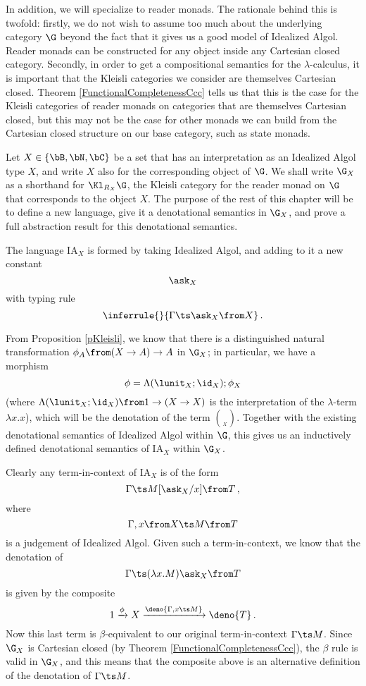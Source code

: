 In addition, we will specialize to reader monads.  
The rationale behind this is twofold: firstly, we do not wish to assume too much about the underlying category $\G$ beyond the fact that it gives us a good model of Idealized Algol.  
Reader monads can be constructed for any object inside any Cartesian closed category.
Secondly, in order to get a compositional semantics for the $\lambda$-calculus, it is important that the Kleisli categories we consider are themselves Cartesian closed.  
Theorem \ref{FunctionalCompletenessCcc} tells us that this is the case for the Kleisli categories of reader monads on categories that are themselves Cartesian closed, but this may not be the case for other monads we can build from the Cartesian closed structure on our base category, such as state monads.

Let $X\in \{\bB,\bN,\bC\}$ be a set that has an interpretation as an Idealized Algol type $X$, and write $X$ also for the corresponding object of $\G$.
We shall write $\G_X$ as a shorthand for $\Kl_{R_X}\G$, the Kleisli category for the reader monad on $\G$ that corresponds to the object $X$.  
The purpose of the rest of this chapter will be to define a new language, give it a denotational semantics in $\G_X$, and prove a full abstraction result for this denotational semantics.

\newcommand{\IAX}{{IA${}_X$}\xspace}
\begin{definition}[{The language \IAX}]
  The language \IAX is formed by taking Idealized Algol, and adding to it a new constant
  \[
    \ask_X
    \]
  with typing rule
  \[
    \inferrule{ }{\Gamma \ts \ask_X \from X}\,.
    \]
\end{definition}

From Proposition \ref{pKleisli}, we know that there is a distinguished natural transformation $\phi_A \from (X \to A) \to A$ in $\G_X$; in particular, we have a morphism
\[
  \phi = \Lambda(\lunit_X;\id_X);\phi_X
  \]
(where $\Lambda(\lunit_X;\id_X)\from 1 \to (X \to X)$ is the interpretation of the $\lambda$-term $\lambda x.x$), which will be the denotation of the term $\choose_X$.
Together with the existing denotational semantics of Idealized Algol within $\G$, this gives us an inductively defined denotational semantics of \IAX within $\G_X$.

Clearly any term-in-context of \IAX is of the form
\[
  \Gamma \ts M[\ask_X/x]\from T\,,
  \]
where
\[
  \Gamma,x\from X \ts M \from T
  \]
is a judgement of Idealized Algol.
Given such a term-in-context, we know that the denotation of
\[
  \Gamma\ts (\lambda x.M) \ask_X \from T
  \]
is given by the composite
\[
  1 \xrightarrow{\phi}
  X \xrightarrow{\deno{\Gamma,x \ts M}}
  \deno{T}\,.
  \]
Now this last term is $\beta$-equivalent to our original term-in-context $\Gamma\ts M$.  
Since $\G_X$ is Cartesian closed (by Theorem \ref{FunctionalCompletenessCcc}), the $\beta$ rule is valid in $\G_X$, and this means that the composite above is an alternative definition of the denotation of $\Gamma\ts M$.

